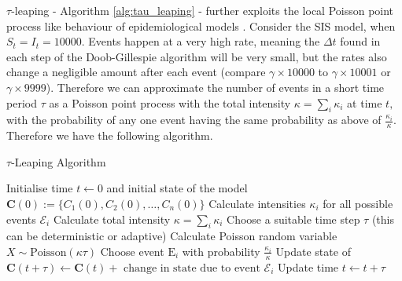 $\tau$-leaping - Algorithm \ref{alg:tau_leaping} - further exploits the 
local Poisson point process like behaviour of
epidemiological models \parencite{gillespie_approximate_2001}. 
Consider the SIS model, 
when $S_t = I_t = 10000.$ Events happen at a very high rate, meaning 
the $\Delta t$ found in each step of the Doob-Gillespie algorithm will be 
very small, but the rates also change a negligible amount after each event 
(compare $\gamma\times 10000$ to $\gamma\times 10001$ or $\gamma\times 9999$). 
Therefore we can approximate the number of events in a short time period 
$\tau$ as a Poisson point process with the total intensity 
$\kappa = \sum_i \kappa_i$ at time $t,$ with the probability of any one 
event having the same probability as above of $\frac{\kappa_i}{\kappa}.$ 
Therefore we have the following algorithm.

\begin{algorithm}
    \caption{$\tau$-Leaping Algorithm \cite{gillespie_approximate_2001}}
    \label{alg:tau_leaping}
    \begin{algorithmic}
        \State Initialise time $t \gets 0$ and initial state of the model $\mathbf{C}(0) := \{C_1(0), C_2(0), \dots, C_n(0)\}$
        \State Calculate intensities $\kappa_i$ for all possible events $\mathcal{E}_i$
        \State Calculate total intensity $\kappa = \sum_i \kappa_i$
        \State Choose a suitable time step $\tau$ (this can be deterministic or adaptive)
        \State Calculate Poisson random variable $X \sim \text{Poisson}(\kappa\tau)$
        \State Choose event $\mathrm{E}_i$ with probability $\frac{\kappa_i}{\kappa}$
        \State Update state of $\mathbf{C}(t + \tau) \gets \mathbf{C}(t) + \text{ change in state due to event } \mathcal{E}_i$
        \EndFor
        \State Update time $t \gets t + \tau$
        \EndWhile
    \end{algorithmic}
\end{algorithm}

